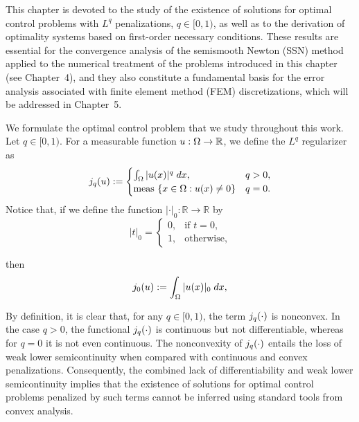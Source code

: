 		This chapter is devoted to the study of the existence of solutions for optimal control problems with $L^q$ 
		penalizations, $q\in[0,1)$, as well as to the derivation of optimality systems based on first-order necessary 
		conditions. These results are essential for the convergence analysis of the semismooth Newton (SSN) method applied to 
		the numerical treatment of the problems introduced in this chapter (see Chapter~4), and they also constitute a fundamental 
		basis for the error analysis associated with finite element method (FEM) discretizations, which will be addressed in 
		Chapter~5.
		
		We formulate the optimal control problem that we study throughout this work.
		 Let $q\in [0,1)$. For a measurable function $u: \Omega \to \mathbb{R}$, 
		 we define the $L^q$ regularizer as
		\begin{equation}\label{eq:l_q}
			j_q(u):=\begin{cases}
				\int_{\Omega} |u(x)|^q \; dx,& q>0,\\
				\mbox{meas }\{x\in \Omega: u(x)\ne 0\}&q=0.
			\end{cases}
		\end{equation}
		Notice that, if we define the function $|\cdot|_{0}:\mathbb{R}\to\mathbb{R}$ by
		\begin{equation}\label{eq:indicator}
		|t|_{0} =
		\begin{cases}
		0, & \text{if } t = 0,\\
		1, & \text{otherwise},
		\end{cases}		
		\end{equation}

		then	
		\begin{equation}\label{eq:l_0}
			j_0(u):=\int_{\Omega} |u(x)|_{0} \; dx,
		\end{equation}
				
		By definition, it is clear that, for any $q\in[0,1)$, the term $j_q(\cdot)$ is nonconvex. 
		In the case $q>0$, the functional $j_q(\cdot)$ is continuous but not differentiable, 
		whereas for $q=0$ it is not even continuous. The nonconvexity of $j_q(\cdot)$ entails the loss of weak 
		lower semicontinuity when compared with continuous and convex penalizations. Consequently, the combined lack of 
		differentiability and weak lower semicontinuity implies that the existence of solutions for optimal control problems 
		penalized by such terms cannot be inferred using standard tools from convex analysis.

